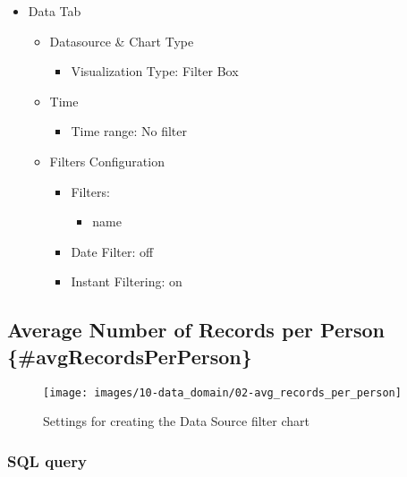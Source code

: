\documentclass[
]{book}
\providecommand{\tightlist}{%
  \setlength{\itemsep}{0pt}\setlength{\parskip}{0pt}}
\begin{document}
\begin{itemize}
\tightlist
\item
  Data Tab

  \begin{itemize}
  \tightlist
  \item
    Datasource \& Chart Type

    \begin{itemize}
    \tightlist
    \item
      Visualization Type: Filter Box
    \end{itemize}
  \item
    Time

    \begin{itemize}
    \tightlist
    \item
      Time range: No filter
    \end{itemize}
  \item
    Filters Configuration

    \begin{itemize}
    \tightlist
    \item
      Filters:

      \begin{itemize}
      \tightlist
      \item
        name
      \end{itemize}
    \item
      Date Filter: off
    \item
      Instant Filtering: on
    \end{itemize}
  \end{itemize}
\end{itemize}

\hypertarget{average-number-of-records-per-person-avgrecordsperperson}{%
\subsection*{Average Number of Records per Person \{\#avgRecordsPerPerson\}}\label{average-number-of-records-per-person-avgrecordsperperson}}

\begin{figure}
\texttt{[image: images/10-data\_domain/02-avg\_records\_per\_person]} \caption{Settings for creating the Data Source filter chart}\label{fig:unnamed-chunk-1}
\end{figure}

\hypertarget{sql-query-34}{%
\subsubsection*{SQL query}\label{sql-query-34}}
\end{document}
